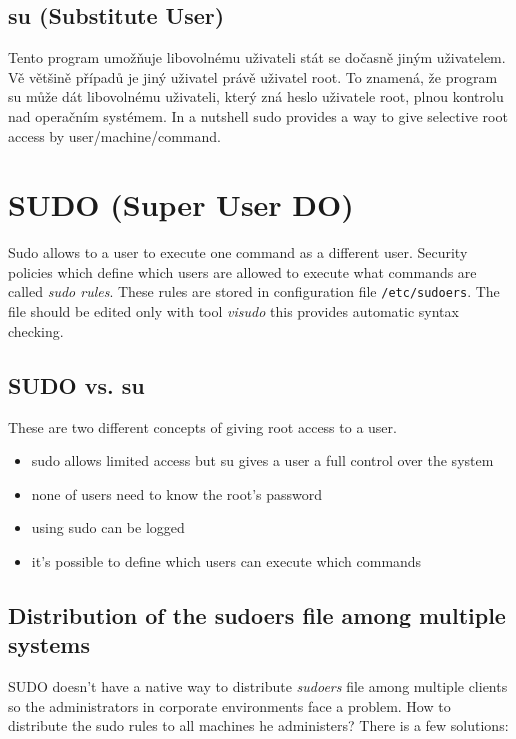 \documentclass[12pt,a4paper,titlepage,final]{article}
\begin{document}
\subsection{su (Substitute User)}
Tento program umožňuje libovolnému uživateli stát se dočasně jiným uživatelem.
Vě většině případů je jiný uživatel právě uživatel root. To znamená, že program
su může dát libovolnému uživateli, který zná heslo uživatele root, plnou
kontrolu nad operačním systémem. In a nutshell sudo provides a way to give
selective root access by user/machine/command.


\section{SUDO (Super User DO)}

Sudo allows to a user to execute one command as a different user. Security
policies which define which users are allowed to execute what commands are
called \emph{sudo rules}. These rules are stored in configuration file
\texttt{/etc/sudoers}. The file should be edited only with tool \emph{visudo}
this provides automatic syntax checking.

\subsection{SUDO vs. su}
These are two different concepts of giving root access to a user.

\begin{itemize}
	\item sudo allows limited access but su gives a user a full control over the
		system
	\item none of users need to know the root's password
	\item using sudo can be logged
	\item it's possible to define which users can execute which commands
\end{itemize}


\subsection{Distribution of the sudoers file among multiple systems}
SUDO doesn't have a native way to distribute \emph{sudoers} file among multiple
clients so the administrators in corporate environments face a problem. How to
distribute the sudo rules to all machines he administers? There is a few
solutions:
\end{document}

